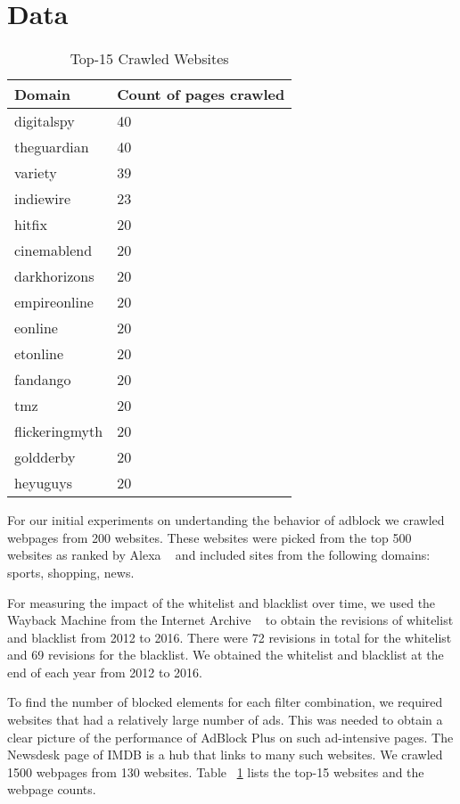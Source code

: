 \section{Data}
\begin{table}[]
\label{tab:website}
\begin{tabular}{|l|l|}
\hline
Domain         & Count of pages crawled \\ \hline
digitalspy     & 40                     \\ \hline
theguardian    & 40                     \\ \hline
variety        & 39                     \\ \hline
indiewire      & 23                     \\ \hline
hitfix         & 20                     \\ \hline
cinemablend    & 20                     \\ \hline
darkhorizons   & 20                     \\ \hline
empireonline   & 20                     \\ \hline
eonline        & 20                     \\ \hline
etonline       & 20                     \\ \hline
fandango       & 20                     \\ \hline
tmz            & 20                     \\ \hline
flickeringmyth & 20                     \\ \hline
goldderby      & 20                     \\ \hline
heyuguys       & 20                     \\ \hline
\end{tabular}
\centering
\caption{Top-15 Crawled Websites}
\end{table}

For our initial experiments on  undertanding the behavior of adblock we crawled webpages from  200 websites.
These websites were picked from the  top 500 websites as ranked by Alexa ~\cite{alexa} and included sites from the following domains: sports, shopping, news.

For measuring the impact of the whitelist and blacklist over time, we used the Wayback Machine from the Internet Archive ~\cite{wayback} to obtain the revisions of whitelist and blacklist from 2012 to 2016.
There were 72 revisions in total for the whitelist and 69 revisions for the blacklist. We obtained the whitelist and blacklist at the end of each year from 2012 to 2016.

To find the number of blocked elements for each filter combination, we required websites that had a relatively large number of ads.
This was needed to obtain a clear picture of the performance of AdBlock Plus on such ad-intensive pages.
The Newsdesk page of IMDB is a hub that links to many such websites. We crawled 1500 webpages from 130 websites.
Table ~\ref{tab:website} lists the top-15 websites and the webpage counts.
